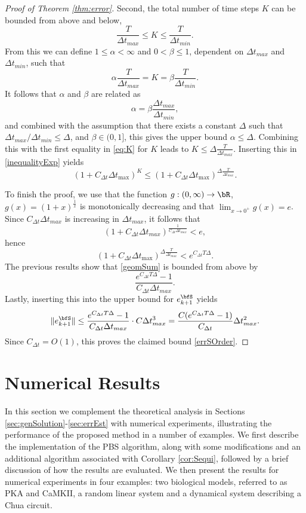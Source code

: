 \documentclass[DIV=12]{scrartcl} %
\newcommand{\err}{\ensuremath{e}}
\theoremstyle{definition}
\begin{document}
\begin{proof}[Proof of Theorem \ref{thm:error}]
Second, the total number of time steps $K$ can be bounded from above and below,
\[\frac{T}{\Delta t_{max}}\le K\le \frac{T}{\Delta t_{min}}.\]
From this we can define $1\le\alpha<\infty$ and $0<\beta\le1$, dependent on $\Delta t_{max}$ and $\Delta t_{min}$, such that 
\begin{equation}
    \label{eq:K}
\alpha \frac{T}{\Delta t_{max}}=K=\beta \frac{T}{\Delta t_{min}}.
\end{equation}
It follows that $\alpha$ and $\beta$ are related as
\[\alpha = \beta \frac{\Delta t_{max}}{\Delta t_{min}}, \]
and combined with the assumption that there exists a constant $\Delta$ such that $\Delta t_{max} / \Delta t _{min} \leq \Delta$, and $\beta \in (0,1]$, this gives the upper bound $\alpha \leq \Delta$. Combining this with the first equality in \eqref{eq:K} for $K$ leads to $K\le \Delta \frac{T}{\Delta t_{max}}$. Inserting this in \eqref{inequalityExp} yields
\[
\left(1 + C_{\Delta t}\Delta t_{\max}\right)^{K}\le \left(1 + C_{\Delta t}\Delta t_{\max}\right)^{ \Delta \frac{T}{\Delta t_{max}}}.
\]

To finish the proof, we use that the function $g:(0,\infty)\to\bR$, $g(x)=(1+x)^{\frac{1}{x}}$ is monotonically decreasing and that $\lim_{x\to0^+}g(x)=e$. Since $C_{\Delta t}\Delta t_{max}$ is increasing in $\Delta t_{max}$, it follows that  
\[
(1+C_{\Delta t}\Delta t_{max})^{\frac{1}{C_{\Delta t}\Delta t_{max}}}<e,
\]
hence
\[\left(1 + C_{\Delta t}\Delta t_{\max}\right)^{ \Delta \frac{T}{\Delta t_{max}}}<e^{C_{\Delta t}T\Delta}.
\]
The previous results show that \eqref{geomSum} is bounded from above by
\[
\frac{e^{C_{\Delta t}T\Delta}-1}{C_{\Delta t}\Delta t_{max}}.
\]
Lastly, inserting this into the upper bound for $\err _{k+1} ^\bfS$ yields
\[
\|\err_{k+1}^\bfS\|\le \frac{e^{C_{\Delta t}T\Delta}-1}{C_{\Delta t}\Delta t_{max}}\cdot C\Delta t_{max}^3=\frac{C(e^{C_{\Delta t}T\Delta}-1)}{C_{\Delta t}}\Delta t_{max}^2.
\]
Since $C_{\Delta t}=O(1)$, this proves the claimed bound \eqref{errSOrder}.
\end{proof}

\section{Numerical Results}
\label{sec:numerical}
In this section we complement the theoretical analysis in Sections \ref{sec:genSolution}-\ref{sec:errEst} with numerical experiments, illustrating the performance of the proposed method in a number of examples. We first describe the implementation of the PBS algorithm, along with some modifications and an additional algorithm associated with Corollary \ref{cor:Sequi}, followed by a brief discussion of how the results are evaluated. We then present the results for numerical experiments in  four examples: two biological models, referred to as PKA and CaMKII, a random linear system and a dynamical system describing a Chua circuit.
\end{document}
